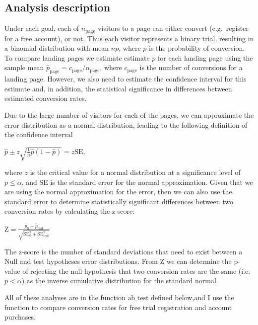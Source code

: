 \documentclass{article}
\begin{document}
    \subsection{Analysis description}\label{analysis-description}

Under each goal, each of $n_{\text{page}}$ visitors to a page can either
convert (e.g.~register for a free account), or not. Thus each visitor
represents a binary trial, resulting in a binomial distribution with
mean $np$, where $p$ is the probability of conversion. To compare
landing pages we estimate estimate $p$ for each landing page using the
sample mean $\hat p_{\text{page}} = c_{\text{page}} / n_{\text{page}}$,
where $c_{\text{page}}$ is the number of conversions for a landing page.
However, we also need to estimate the confidence interval for this
estimate and, in addition, the statistical significance in differences
between estimated conversion rates.

Due to the large number of visitors for each of the pages, we can
approximate the error distribution as a normal distribution, leading to
the following definition of the confidence interval

$\hat p \pm z \sqrt{\frac{1}{n} \hat p(1 - \hat p)} = z\text{SE}$,

where $z$ is the critical value for a normal distribution at a
significance level of $p\leq \alpha$, and $\text{SE}$ is the standard
error for the normal approximation. Given that we are using the normal
approximation for the error, then we can also use the standard error to
determine statistically significant differences between two conversion
rates by calculating the z-score:

$\text{Z} = \frac{\hat p_0 - \hat p_{\text{test}}}{\sqrt{\text{SE}_0^2 + \text{SE}_{\text{test}}^2}}$

The z-score is the number of standard deviations that need to exist
between a Null and test hypotheses error distributions. From $\text{Z}$
we can determine the p-value of rejecting the null hypothesis that two
conversion rates are the same (i.e. $p<\alpha$) as the inverse
cumulative distribution for the standard normal.

All of these analyses are in the function $\text{ab_test}$ defined
below,and I use the function to compare conversion rates for free trial
registration and account purchases.
\end{document}
